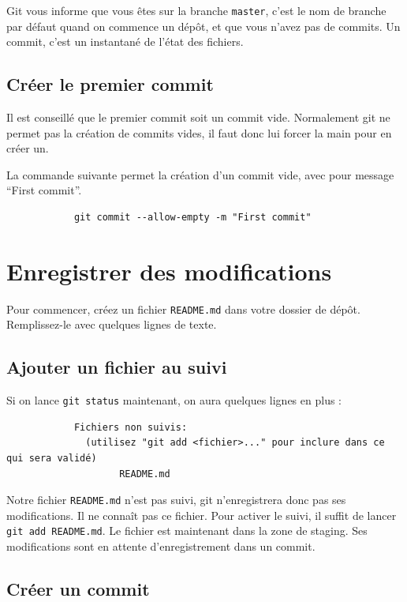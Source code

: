 \documentclass[10pt,a4paper,french]{article}
\begin{document}
    Git vous informe que vous êtes sur la branche \verb|master|, c'est le nom de branche par défaut quand on commence un dépôt, et que vous n'avez pas de commits. Un commit, c'est un instantané de l'état des fichiers.

    \subsection{Créer le premier commit}

        Il est conseillé que le premier commit soit un commit vide. Normalement git ne permet pas la création de commits vides, il faut donc lui forcer la main pour en créer un.

        La commande suivante permet la création d'un commit vide, avec pour message ``First commit''.
        \begin{verbatim}
            git commit --allow-empty -m "First commit"
        \end{verbatim}

\section{Enregistrer des modifications}

    Pour commencer, créez un fichier \verb|README.md| dans votre dossier de dépôt. Remplissez-le avec quelques lignes de texte.

    \subsection{Ajouter un fichier au suivi}

        Si on lance \verb|git status| maintenant, on aura quelques lignes en plus :
        \begin{verbatim}
            Fichiers non suivis:
              (utilisez "git add <fichier>..." pour inclure dans ce qui sera validé)
                    README.md
        \end{verbatim}

        Notre fichier \verb|README.md| n'est pas suivi, git n'enregistrera donc pas ses modifications. Il ne connaît pas ce fichier. Pour activer le suivi, il suffit de lancer \verb|git add README.md|. Le fichier est maintenant dans la zone de staging. Ses modifications sont en attente d'enregistrement dans un commit.

    \subsection{Créer un commit}
\end{document}
